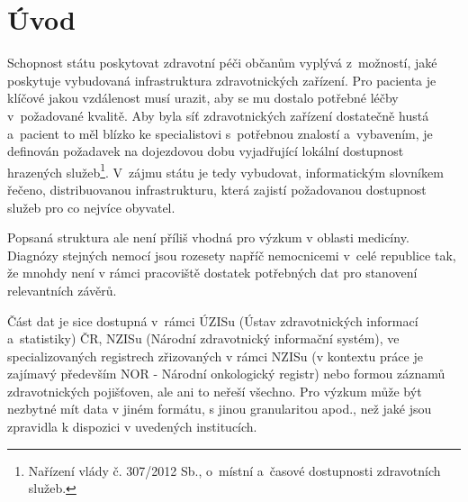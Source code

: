 \documentclass[11pt,draft,oneside]{fithesis2}
\begin{document}
\MainMatter

\tableofcontents



\chapter{Úvod}
Schopnost státu poskytovat zdravotní péči občanům vyplývá z~možností, jaké poskytuje vybudovaná infrastruktura zdravotnických zařízení. Pro pacienta je klíčové jakou vzdálenost musí urazit, aby se mu dostalo potřebné léčby v~požadované kvalitě. Aby byla síť zdravotnických zařízení dostatečně hustá a~pacient to měl blízko ke specialistovi s~potřebnou znalostí a~vybavením, je definován požadavek na dojezdovou dobu vyjadřující lokální dostupnost hrazených služeb\footnote{Nařízení vlády č. 307/2012 Sb., o~místní a~časové dostupnosti zdravotních služeb.}. V~zájmu státu je tedy vybudovat, informatickým slovníkem řečeno, distribuovanou infrastrukturu, která zajistí požadovanou dostupnost služeb pro co nejvíce obyvatel. 

Popsaná struktura ale není příliš vhodná pro výzkum v oblasti medicíny. Diagnózy stejných nemocí jsou rozesety napříč nemocnicemi v~celé republice tak, že mnohdy není v rámci pracoviště dostatek potřebných dat pro stanovení relevantních závěrů.

Část dat je sice dostupná v~rámci ÚZISu (Ústav zdravotnických informací a~statistiky) ČR, NZISu (Národní zdravotnický informační systém), ve specializovaných registrech zřizovaných v rámci NZISu (v kontextu práce je zajímavý především NOR - Národní onkologický registr) nebo formou záznamů zdravotnických pojišťoven, ale ani to neřeší všechno. Pro výzkum může být nezbytné mít data v jiném formátu, s jinou granularitou apod., než jaké jsou zpravidla k dispozici v uvedených institucích.  
\end{document}
